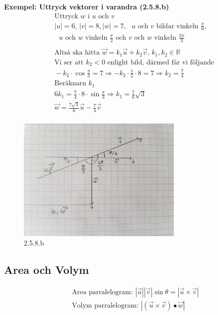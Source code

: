 \begin{multicols}{2}
\textbf{Exempel: Uttryck vektorer i varandra (2.5.8.b)}
\begin{align*}
  &\quad  \text{Uttryck $w$ i $u$ och $v$} \\
  &\quad  |u|=6, \, |v|=8, |w|=7, \text{ $u$ och $v$ bildar vinkeln } \frac{\pi}{6}, \\
  &\quad  \text{ $u$ och $w$ vinkeln } \frac{\pi}{2} \text{ och $v$ och $w$ vinkeln } 
  \frac{2\pi}{3}  \\
  &\quad  \\
  &\quad  \text{Altså ska hitta } \vec{w}=k_1\vec{u}+k_2\vec{v}, \, k_1,k_2\in\mathbb{R} \\
  &\quad  \text{Vi ser att $k_2<0$ enlight bild, därmed får vi följande } \\
  &\quad  -k_2\cdot\cos{\frac{\pi}{3}}=7 \Rightarrow -k_2\cdot{\frac{1}{2}}\cdot{8}=7
  \Rightarrow k_2=\frac{7}{4} \\
  &\quad  \text{Beräknarn $k_1$ } \\
  &\quad  6k_1=\frac{7}{4}\cdot{8}\cdot{\sin{\frac{\pi}{3}}} \Rightarrow k_1=\frac{7}{6}\sqrt{3} \\
  &\quad  \vec{w}=\frac{7\sqrt{3}}{6}\vec{u}-\frac{7}{4}\vec{v} \\
\end{align*}
\begin{figure}[H]
    \centering
    \includegraphics[width=8cm]{image/2.5.8.b.jpg} 
    \caption{2.5.8.b}
\end{figure}


\subsection{Area och Volym}
\begin{align*} 
  &\quad  \text{Area parralelogram: } |\vec{u}||\vec{v}|\sin{\theta} = |\vec{u}\times\vec{v}| \\
  &\quad  \text{Volym parralelogram: } |(\vec{u}\times\vec{v})\bullet\vec{w}|
\end{align*}


\end{multicols}
